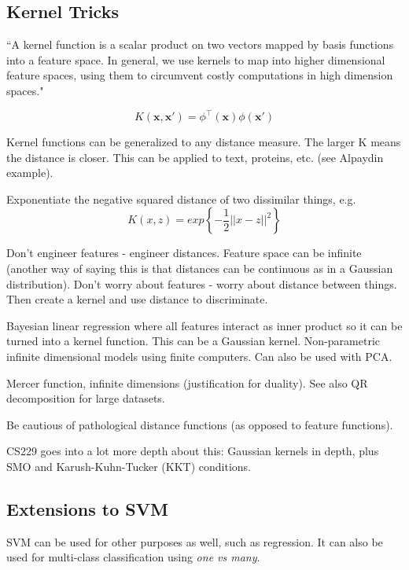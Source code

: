 \documentclass[11pt, oneside]{article}   	%
\begin{document}
\subsection {Kernel Tricks}


``A kernel function is a scalar product on two vectors mapped by basis functions into a feature space. In general, we use kernels to map into higher dimensional feature spaces, using them to circumvent costly computations in high dimension spaces."

\begin{equation}
K(\mathbf{x},\mathbf{x}') = \phi^\intercal(\mathbf{x})\phi(\mathbf{x}')
\end{equation}

Kernel functions can be generalized to any distance measure. The larger K means the distance is closer. This can be applied to text, proteins, etc. (see Alpaydin example).

Exponentiate the negative squared distance of two dissimilar things, e.g.
\begin{equation}
K(x,z) = exp\left\{ -\frac{1}{2} ||x - z||^2 \right\}
\end{equation}

Don't engineer features - engineer distances. Feature space can be infinite (another way of saying this is that distances can be continuous as in a Gaussian distribution). Don't worry about features - worry about distance between things. Then create a kernel and use distance to discriminate.

Bayesian linear regression where all features interact as inner product so it can be turned into a kernel function. This can be a Gaussian kernel. Non-parametric infinite dimensional models using finite computers. Can also be used with PCA.

Mercer function, infinite dimensions (justification for duality). See also QR decomposition for large datasets.

Be cautious of pathological distance functions (as opposed to feature functions).

CS229 goes into a lot more depth about this: Gaussian kernels in depth, plus SMO and Karush-Kuhn-Tucker (KKT) conditions.

\subsection{Extensions to SVM}

SVM can be used for other purposes as well, such as regression. It can also be used for multi-class classification using \emph{one vs many}.
\end{document}
